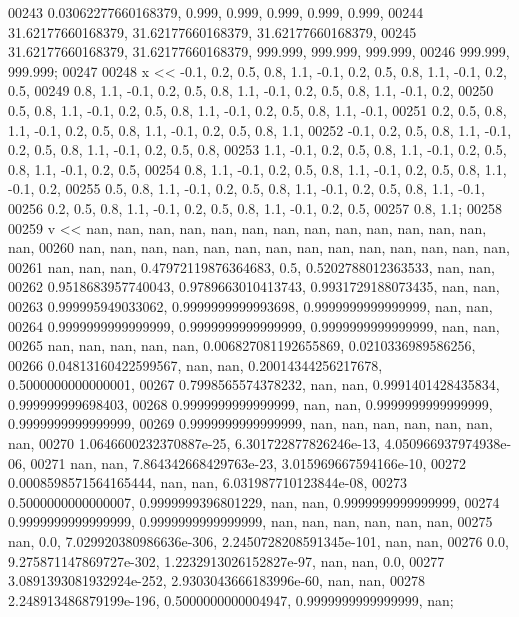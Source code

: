 \begin{DoxyCode}
00243         0.03062277660168379, 0.999, 0.999, 0.999, 0.999, 0.999,
00244         31.62177660168379, 31.62177660168379, 31.62177660168379,
00245         31.62177660168379, 31.62177660168379, 999.999, 999.999, 999.999,
00246         999.999, 999.999;
00247 
00248     x << -0.1, 0.2, 0.5, 0.8, 1.1, -0.1, 0.2, 0.5, 0.8, 1.1, -0.1, 0.2, 0.5,
00249         0.8, 1.1, -0.1, 0.2, 0.5, 0.8, 1.1, -0.1, 0.2, 0.5, 0.8, 1.1, -0.1, 0.2,
00250         0.5, 0.8, 1.1, -0.1, 0.2, 0.5, 0.8, 1.1, -0.1, 0.2, 0.5, 0.8, 1.1, -0.1,
00251         0.2, 0.5, 0.8, 1.1, -0.1, 0.2, 0.5, 0.8, 1.1, -0.1, 0.2, 0.5, 0.8, 1.1,
00252         -0.1, 0.2, 0.5, 0.8, 1.1, -0.1, 0.2, 0.5, 0.8, 1.1, -0.1, 0.2, 0.5, 0.8,
00253         1.1, -0.1, 0.2, 0.5, 0.8, 1.1, -0.1, 0.2, 0.5, 0.8, 1.1, -0.1, 0.2, 0.5,
00254         0.8, 1.1, -0.1, 0.2, 0.5, 0.8, 1.1, -0.1, 0.2, 0.5, 0.8, 1.1, -0.1, 0.2,
00255         0.5, 0.8, 1.1, -0.1, 0.2, 0.5, 0.8, 1.1, -0.1, 0.2, 0.5, 0.8, 1.1, -0.1,
00256         0.2, 0.5, 0.8, 1.1, -0.1, 0.2, 0.5, 0.8, 1.1, -0.1, 0.2, 0.5,
00257         0.8, 1.1;
00258 
00259     v << nan, nan, nan, nan, nan, nan, nan, nan, nan, nan, nan, nan, nan, nan,
00260         nan, nan, nan, nan, nan, nan, nan, nan, nan, nan, nan, nan, nan, nan,
00261         nan, nan, nan, 0.47972119876364683, 0.5, 0.5202788012363533, nan, nan,
00262         0.9518683957740043, 0.9789663010413743, 0.9931729188073435, nan, nan,
00263         0.999995949033062, 0.9999999999993698, 0.9999999999999999, nan, nan,
00264         0.9999999999999999, 0.9999999999999999, 0.9999999999999999, nan, nan,
00265         nan, nan, nan, nan, nan, 0.006827081192655869, 0.0210336989586256,
00266         0.04813160422599567, nan, nan, 0.20014344256217678, 0.5000000000000001,
00267         0.7998565574378232, nan, nan, 0.9991401428435834, 0.999999999698403,
00268         0.9999999999999999, nan, nan, 0.9999999999999999, 0.9999999999999999,
00269         0.9999999999999999, nan, nan, nan, nan, nan, nan, nan,
00270         1.0646600232370887e-25, 6.301722877826246e-13, 4.050966937974938e-06,
00271         nan, nan, 7.864342668429763e-23, 3.015969667594166e-10,
00272         0.0008598571564165444, nan, nan, 6.031987710123844e-08,
00273         0.5000000000000007, 0.9999999396801229, nan, nan, 0.9999999999999999,
00274         0.9999999999999999, 0.9999999999999999, nan, nan, nan, nan, nan, nan,
00275         nan, 0.0, 7.029920380986636e-306, 2.2450728208591345e-101, nan, nan,
00276         0.0, 9.275871147869727e-302, 1.2232913026152827e-97, nan, nan, 0.0,
00277         3.0891393081932924e-252, 2.9303043666183996e-60, nan, nan,
00278         2.248913486879199e-196, 0.5000000000004947, 0.9999999999999999, nan;

\end{DoxyCode}
